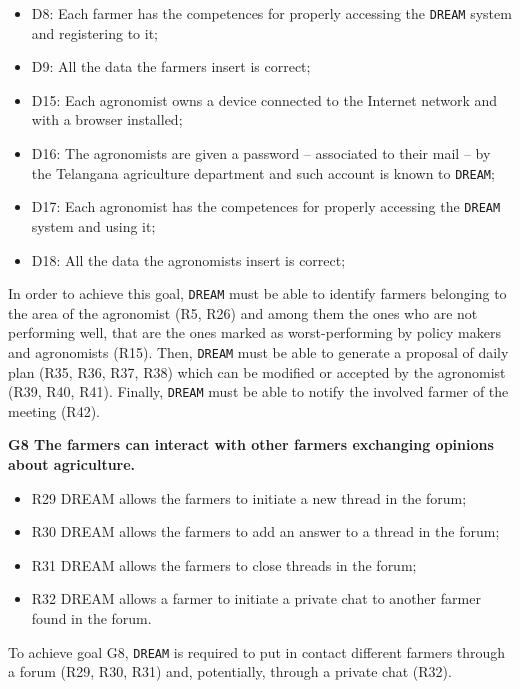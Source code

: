 \documentclass{article}
\begin{document}
\begin{itemize}
    \item D8: Each farmer has the competences for properly accessing the \verb|DREAM| system and registering to it;
    
    \item D9: All the data the farmers insert is correct;
    
    \item D15: Each agronomist owns a device connected to the Internet network and with a browser installed;

    \item D16: The agronomists are given a password – associated to their mail – by the Telangana agriculture department and such account is known to \verb|DREAM|;

    \item D17: Each agronomist has the competences for properly accessing the \verb|DREAM| system and using it;
  
    \item D18: All the data the agronomists insert is correct;
\end{itemize}
In order to achieve this goal, \verb|DREAM| must be able to identify farmers belonging to the area of the agronomist (R5, R26) and among them the ones who are not performing well, that are the ones marked as worst-performing by policy makers and agronomists (R15). Then, \verb|DREAM| must be able to generate a proposal of daily plan (R35, R36, R37, R38) which can be modified or accepted by the agronomist (R39, R40, R41). Finally, \verb|DREAM| must be able to notify the involved farmer of the meeting (R42).

\vspace{5mm}
\textbf{G8 The farmers can interact with other farmers exchanging opinions about agriculture.}
\begin{itemize}
    \item R29 DREAM allows the farmers to initiate a new thread in the forum;

    \item R30 DREAM allows the farmers to add an answer to a thread in the forum;

    \item R31 DREAM allows the farmers to close threads in the forum;

    \item R32 DREAM allows a farmer to initiate a private chat to another farmer found in the forum.
\end{itemize}
To achieve goal G8, \verb|DREAM| is required to put in contact different farmers through a forum (R29, R30, R31) and, potentially, through a private chat (R32).
\end{document}
